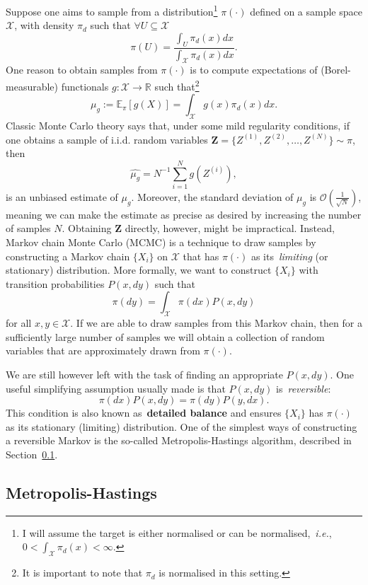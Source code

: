 Suppose one aims to sample from a distribution\footnote{I will assume the target is either normalised or can be normalised,~\textit{i.e.}, $ 0 < \int_{\mathcal{X}} \pi_d(x) <\infty$. } $\pi(\cdot)$ defined on a sample space $\mathcal{X}$, with density $\pi_d$ such that $\forall U \subseteq \mathcal{X}$
\[ \pi(U) = \frac{\int_{U} \pi_d(x)dx }{\int_{\mathcal{X}} \pi_d(x)dx}. \]
One reason to obtain samples from $\pi(\cdot)$ is to compute expectations of (Borel-measurable) functionals $g :\mathcal{X} \to \mathbb{R}$ such that\footnote{It is important to note that $\pi_d$ is normalised in this setting.}
\[\mu_g := \mathbb{E}_{\pi} [g(X)] = \int_{\mathcal{X}} g(x) \pi_d(x) dx. \] 
Classic Monte Carlo theory says that, under some mild regularity conditions, if one obtains a sample of i.i.d. random variables $\boldsymbol Z = \{ Z^{(1)}, Z^{(2)}, \ldots, Z^{(N)} \} \sim \pi$, then
\[ \widehat{\mu_g} = N^{-1}\sum_{i=1}^N g(Z^{(i)}), \]
is an unbiased estimate of $\mu_g$.
Moreover, the standard deviation of $\widehat{\mu_g}$ is $\mathcal{O}(\frac{1}{\sqrt{N}})$, meaning we can make the estimate as precise as desired by increasing the number of samples $N$.
Obtaining $\boldsymbol Z$ directly, however, might be impractical.
Instead, Markov chain Monte Carlo (MCMC) is a technique to draw samples by constructing a Markov chain $\{X_i\}$ on $\mathcal{X}$ that has $\pi(\cdot)$ as its~\textit{limiting} (or stationary) distribution. 
More formally, we want to construct $\{X_i\}$ with transition probabilities $P(x, dy)$ such that
\[ \pi(dy) = \int_{\mathcal{X}} \pi(dx) P(x, dy)  \]
for all $x,y \in \mathcal{X}$.
If we are able to draw samples from this Markov chain, then for a sufficiently large number of samples we will obtain a collection of random variables that are approximately drawn from $\pi(\cdot)$.

We are still however left with the task of finding an appropriate $P(x, dy)$.
One useful simplifying assumption usually made is that $P(x, dy)$ is~\textit{reversible}:
\[ \pi(dx) P(x, dy) = \pi(dy) P(y, dx) .\]
This condition is also known as~\textbf{detailed balance} and ensures $\{X_i\}$ has $\pi(\cdot)$ as its stationary (limiting) distribution.
One of the simplest ways of constructing a reversible Markov is the so-called Metropolis-Hastings algorithm, described in Section~\ref{sec:MH}. %

\subsection{Metropolis-Hastings}
\label{sec:MH}

